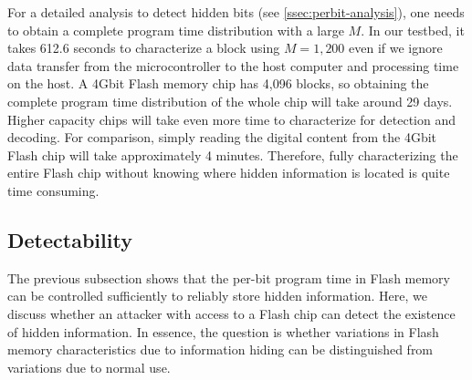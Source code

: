 For a detailed analysis to detect hidden bits (see \ref{ssec:perbit-analysis}),
one needs to obtain a complete program time distribution with a large $M$. 
In our testbed, it takes 612.6 seconds to characterize a block using 
$M = 1,200$ even if we ignore data transfer from the microcontroller to the host
computer and processing time on the host.
A 4Gbit Flash memory chip has 
4,096 blocks, so obtaining the complete program time distribution
of the whole chip will take around 29 days. 
Higher capacity chips will take even more time to characterize for detection
and decoding. For comparison, simply reading
the digital content from the 4Gbit Flash chip will take approximately 4 minutes. 
Therefore, fully characterizing the entire Flash chip without knowing
where hidden information is located is quite time consuming.



\subsection{Detectability}

The previous subsection shows that the per-bit program time in Flash memory
can be controlled sufficiently to reliably store hidden 
information. Here, we 
discuss whether an attacker with access to a Flash chip can detect the 
existence of hidden information. In essence, the question is 
whether variations in Flash memory characteristics due to information 
hiding can be distinguished from variations due to normal use. 

